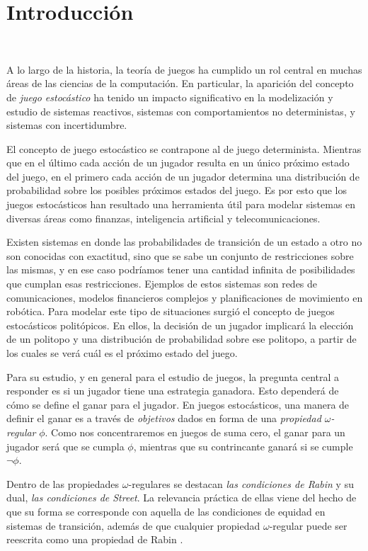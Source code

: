 \chapter{Introducción}
~\label{cap:intro}
\vspace{-1cm}

A lo largo de la historia, la teoría de juegos ha cumplido un rol central en
muchas áreas de las ciencias de la computación. En particular, la aparición del
concepto de \textit{juego estocástico} ha tenido un impacto significativo en la
modelización y estudio de sistemas reactivos, sistemas con comportamientos no
deterministas, y sistemas con incertidumbre.

El concepto de juego estocástico se contrapone al de juego determinista.
Mientras que en el último cada acción de un jugador resulta en un único próximo
estado del juego, en el primero cada acción de un jugador determina una
distribución de probabilidad sobre los posibles próximos estados del juego. Es
por esto que los juegos estocásticos han resultado una herramienta útil para
modelar sistemas en diversas áreas como finanzas, inteligencia artificial y
telecomunicaciones.

Existen sistemas en donde las probabilidades de transición de un estado a otro
no son conocidas con exactitud, sino que se sabe un conjunto de restricciones
sobre las mismas, y en ese caso podríamos tener una cantidad infinita de
posibilidades que cumplan esas restricciones. Ejemplos de estos sistemas son
redes de comunicaciones, modelos financieros complejos y planificaciones de
movimiento en robótica. Para modelar este tipo de situaciones surgió el
concepto de juegos estocásticos politópicos. En ellos, la decisión de un
jugador implicará la elección de un politopo y una distribución de probabilidad
sobre ese politopo, a partir de los cuales se verá cuál es el próximo estado
del juego.

Para su estudio, y en general para el estudio de juegos, la pregunta central a
responder es si un jugador tiene una estrategia ganadora. Esto dependerá de
cómo se define el ganar para el jugador. En juegos estocásticos, una manera de
definir el ganar es a través de \textit{objetivos} dados en forma de una
\textit{propiedad $\omega$-regular} $\phi$. Como nos concentraremos en juegos
de suma cero, el ganar para un jugador será que se cumpla $\phi$, mientras que
su contrincante ganará si se cumple $\neg \phi$.

Dentro de las propiedades $\omega$-regulares se destacan \textit{las
	condiciones de Rabin} y su dual, \textit{las condiciones de Street}. La
relevancia práctica de ellas viene del hecho de que su forma se corresponde con
aquella de las condiciones de equidad en sistemas de transición, además de que
cualquier propiedad $\omega$-regular puede ser reescrita como una propiedad de
Rabin \cite{AutomataLogicsInfiniteGames}.

